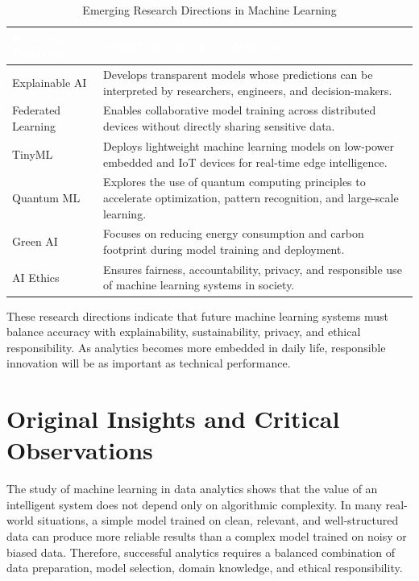 \documentclass[11pt,a4paper]{article}
\begin{document}
\begin{table}[H]
\centering
\caption{Emerging Research Directions in Machine Learning}
\renewcommand{\arraystretch}{1.35}
\small
\begin{tabular}{>{\raggedright\arraybackslash}p{3.4cm} >{\raggedright\arraybackslash}p{10.2cm}}
\toprule
\rowcolor{prismblue}
\textcolor{white}{\textbf{Research Direction}} & \textcolor{white}{\textbf{Importance in Future Analytics}} \\
\midrule
\rowcolor{prismlight}
Explainable AI & Develops transparent models whose predictions can be interpreted by researchers, engineers, and decision-makers. \\
Federated Learning & Enables collaborative model training across distributed devices without directly sharing sensitive data. \\
\rowcolor{prismlight}
TinyML & Deploys lightweight machine learning models on low-power embedded and IoT devices for real-time edge intelligence. \\
Quantum ML & Explores the use of quantum computing principles to accelerate optimization, pattern recognition, and large-scale learning. \\
\rowcolor{prismlight}
Green AI & Focuses on reducing energy consumption and carbon footprint during model training and deployment. \\
AI Ethics & Ensures fairness, accountability, privacy, and responsible use of machine learning systems in society. \\
\bottomrule
\end{tabular}
\end{table}

These research directions indicate that future machine learning systems must balance accuracy with explainability, sustainability, privacy, and ethical responsibility. As analytics becomes more embedded in daily life, responsible innovation will be as important as technical performance.


\section{Original Insights and Critical Observations}

The study of machine learning in data analytics shows that the value of an intelligent system does not depend only on algorithmic complexity. In many real-world situations, a simple model trained on clean, relevant, and well-structured data can produce more reliable results than a complex model trained on noisy or biased data. Therefore, successful analytics requires a balanced combination of data preparation, model selection, domain knowledge, and ethical responsibility.
\end{document}
